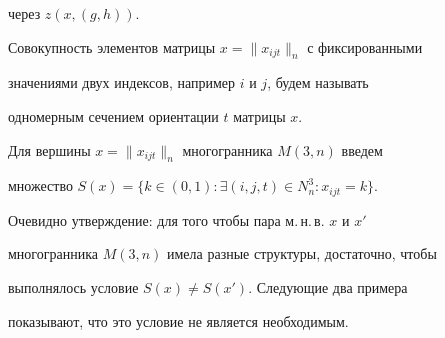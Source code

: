 через $z(x,(g,h))$.





Совокупность элементов матрицы $x=\|x_{ijt}\|_n$ с фиксированными


значениями двух индексов, например $i$ и $j$, будем называть


одномерным сечением ориентации $t$ матрицы $x$.





Для вершины $x=\|x_{ijt}\|_n$ многогранника $M(3,n)$ введем


множество $S(x)=\{k\in (0,1):\exists(i,j,t)\in N^3_n: 


x_{ijt}=k\}$.





Очевидно утверждение: для того чтобы пара м.\,н.\,в. $x$ и $x'$


многогранника $M(3,n)$ имела разные структуры, достаточно, чтобы


выполнялось условие $S(x)\neq S(x')$. Следующие два примера


показывают, что это условие не является необходимым.





